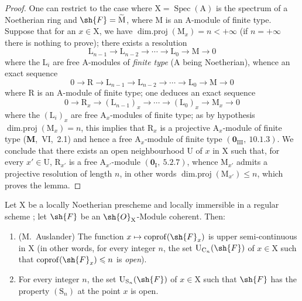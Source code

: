 \begin{proof}
One can restrict to the case where $\mathrm{X}=\operatorname{Spec}(\mathrm{A})$ is the spectrum of a Noetherian ring
and $\sh{F}=\widetilde{\mathrm{M}}$, where $\mathrm{M}$ is an $\mathrm{A}$-module of finite type. Suppose that for an $x\in\mathrm{X}$, we have
$\operatorname{dim.proj}(\mathrm{M}_x)=n<+\infty$ (if $n=+\infty$ there is nothing to prove); there exists a resolution
\[
  \mathrm{L}_{n-1}\to\mathrm{L}_{n-2}\to\cdots\to\mathrm{L}_0\to\mathrm{M}\to 0
\]
where the $\mathrm{L}_i$ are free $\mathrm{A}$-modules of \emph{finite type} ($\mathrm{A}$ being Noetherian), whence an exact sequence
\[
  0\to\mathrm{R}\to\mathrm{L}_{n-1}\to\mathrm{L}_{n-2}\to\cdots\to\mathrm{L}_0\to\mathrm{M}\to 0
\]
where $\mathrm{R}$ is an $\mathrm{A}$-module of finite type; one deduces an exact sequence
\[
  0\to\mathrm{R}_x\to(\mathrm{L}_{n-1})_x\to\cdots\to(\mathrm{L}_0)_x\to\mathrm{M}_x\to 0
\]
where the $(\mathrm{L}_i)_x$ are free $\mathrm{A}_x$-modules of finite type; as by hypothesis
$\operatorname{dim.proj}(\mathrm{M}_x)=n$, this implies that $\mathrm{R}_x$ is a projective $\mathrm{A}_x$-module of finite type
(\textbf{M},~VI,~2.1) and hence a free $\mathrm{A}_x$-module of finite type $(\mathbf{0}_{\mathrm{III}},~10.1.3)$. We conclude
that there exists an open neighbourhood $\mathrm{U}$ of $x$ in $\mathrm{X}$ such that, for every $x'\in\mathrm{U}$, $\mathrm{R}_{x'}$ is a
free $\mathrm{A}_{x'}$-module $(\mathbf{0}_\mathrm{I},~5.2.7)$, whence $\mathrm{M}_{x'}$ admits a projective resolution of length $n$,
in other words $\operatorname{dim.proj}(\mathrm{M}_{x'})\leqslant n$, which proves the lemma.
\end{proof}

\begin{proposition}[6.11.2]
\label{IV.6.11.2}
Let $\mathrm{X}$ be a locally Noetherian prescheme and locally immersible
in a regular scheme ; let $\sh{F}$ be an $\sh{O}_\mathrm{X}$-Module coherent. Then:
\begin{enumerate}[label=(\roman*)]
  \item \textnormal{(M.~Auslander)} The function $x\mapsto\operatorname{coprof}(\sh{F}_x)$ is upper semi-continuous in $\mathrm{X}$
(in other words, for every integer $n$, the set $\mathrm{U}_{\mathrm{C}_n}(\sh{F})$ of $x\in\mathrm{X}$ such that $\operatorname{coprof}(\sh{F}_x)\leqslant n$
is \emph{open}).
  \item For every integer $n$, the set $\mathrm{U}_{\mathrm{S}_n}(\sh{F})$ of $x\in\mathrm{X}$ such that $\sh{F}$ has the property $(\mathrm{S}_n)$
at the point $x$ is open.
\end{enumerate}
\end{proposition}

